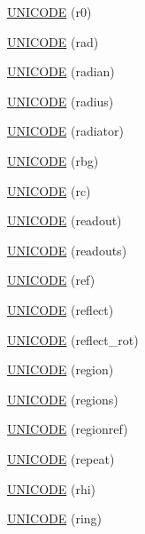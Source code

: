 \begin{DoxyCompactItemize}
\item 
\hyperlink{namespace_d_d4hep_1_1_x_m_l_a85ea7d80bd3befa4ee53f1a24a4987f1}{U\+N\+I\+C\+O\+DE} (r0)
\item 
\hyperlink{namespace_d_d4hep_1_1_x_m_l_a9277b500f3f3becdee4faa89e3ea79b5}{U\+N\+I\+C\+O\+DE} (rad)
\item 
\hyperlink{namespace_d_d4hep_1_1_x_m_l_ab01e99276488dcc59d7e8c61bdddb88b}{U\+N\+I\+C\+O\+DE} (radian)
\item 
\hyperlink{namespace_d_d4hep_1_1_x_m_l_aadc146cc8b286df3373da058a19ff786}{U\+N\+I\+C\+O\+DE} (radius)
\item 
\hyperlink{namespace_d_d4hep_1_1_x_m_l_ada35e3ded11c4999083712dac1905624}{U\+N\+I\+C\+O\+DE} (radiator)
\item 
\hyperlink{namespace_d_d4hep_1_1_x_m_l_a8ced02ee2c8a9dc9616cf731b0676171}{U\+N\+I\+C\+O\+DE} (rbg)
\item 
\hyperlink{namespace_d_d4hep_1_1_x_m_l_a92d22480b19d7705a660c0b1b22f8c18}{U\+N\+I\+C\+O\+DE} (rc)
\item 
\hyperlink{namespace_d_d4hep_1_1_x_m_l_afc57cf9bc4aff1b1a5102c496a605abf}{U\+N\+I\+C\+O\+DE} (readout)
\item 
\hyperlink{namespace_d_d4hep_1_1_x_m_l_ab91949ab80f09b7c3380bb7cbfd501c3}{U\+N\+I\+C\+O\+DE} (readouts)
\item 
\hyperlink{namespace_d_d4hep_1_1_x_m_l_a74bd75de00177939b861db7be1907fa1}{U\+N\+I\+C\+O\+DE} (ref)
\item 
\hyperlink{namespace_d_d4hep_1_1_x_m_l_ade41dd1e835fe39c520cdad69135380b}{U\+N\+I\+C\+O\+DE} (reflect)
\item 
\hyperlink{namespace_d_d4hep_1_1_x_m_l_a5bec99f595a694e2b387971ba02cfa4f}{U\+N\+I\+C\+O\+DE} (reflect\+\_\+rot)
\item 
\hyperlink{namespace_d_d4hep_1_1_x_m_l_ab56a033b5ccf7ae0564ba48af29a4437}{U\+N\+I\+C\+O\+DE} (region)
\item 
\hyperlink{namespace_d_d4hep_1_1_x_m_l_abc3dc713971498b5915e8cf3ffb520e9}{U\+N\+I\+C\+O\+DE} (regions)
\item 
\hyperlink{namespace_d_d4hep_1_1_x_m_l_a372e56ea2f058a5ce07b2e99b25f45a3}{U\+N\+I\+C\+O\+DE} (regionref)
\item 
\hyperlink{namespace_d_d4hep_1_1_x_m_l_a3e129ac4c9aba7038eae558b1970d3c9}{U\+N\+I\+C\+O\+DE} (repeat)
\item 
\hyperlink{namespace_d_d4hep_1_1_x_m_l_a5f9a0389ef1408a6f121b96d4aeb2e07}{U\+N\+I\+C\+O\+DE} (rhi)
\item 
\hyperlink{namespace_d_d4hep_1_1_x_m_l_a78b0ed06c29a49f8af568b54880ee2c4}{U\+N\+I\+C\+O\+DE} (ring)

\end{DoxyCompactItemize}
